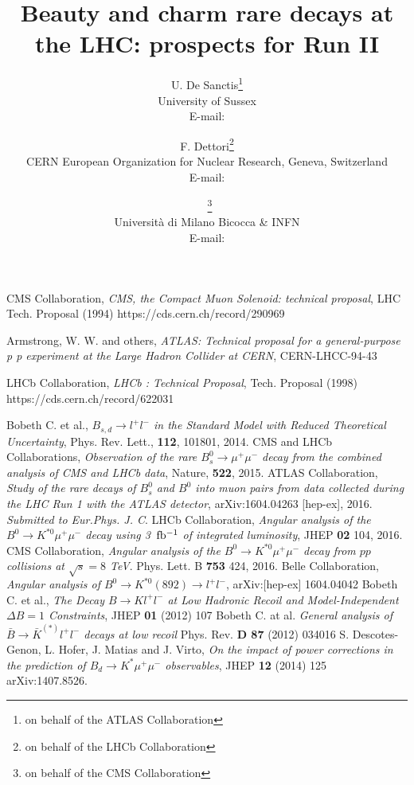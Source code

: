 \documentclass{PoS}
\title{Beauty and charm rare decays at the LHC: prospects for Run II}
\author{U. De Sanctis\thanks{on behalf of the ATLAS Collaboration}\\
        University of Sussex\\
        E-mail: \email{umberto.de.sanctis@cern.ch}\\}
\author{F. Dettori\thanks{on behalf of the LHCb Collaboration}\\
        CERN European Organization for Nuclear Research, Geneva, Switzerland\\
        E-mail: \email{francesco.dettori@cern.ch}\\ }
\author{\speaker{S. Fiorendi}~\thanks{on behalf of the CMS Collaboration}\\
       Universit\`a di Milano Bicocca \& INFN\\
        E-mail: \email{sara.fiorendi@cern.ch}
	}
\begin{document}




\clearpage



\begin{thebibliography}{99}
 CMS Collaboration, 
{\it{CMS, the Compact Muon Solenoid: technical proposal}},
LHC Tech. Proposal (1994) 
https://cds.cern.ch/record/290969

 Armstrong, W. W. and others, 
{\it{ATLAS: Technical proposal for a general-purpose p p experiment at the Large Hadron Collider at CERN}},
CERN-LHCC-94-43 

 LHCb Collaboration, 
{\it{LHCb : Technical Proposal}},
Tech. Proposal (1998) https://cds.cern.ch/record/622031

 Bobeth C. et al., {\it{$B_{s,d} \to l^+ l^-$ in the Standard Model with Reduced Theoretical Uncertainty}}, Phys. Rev. Lett., {\bf{112}}, 101801, 2014.
 CMS and LHCb Collaborations, {\it{Observation of the rare $B^0_s\rightarrow\mu^+\mu^-$ decay from the combined analysis of CMS and LHCb data}}, Nature, {\bf{522}}, 2015.
 ATLAS Collaboration, {\it{Study of the rare decays of $B^0_s$ and $B^0$  into muon pairs from data collected during the LHC Run 1 with the ATLAS detector}}, arXiv:1604.04263 [hep-ex], 2016. {\it{Submitted to Eur.Phys. J. C}}.
 LHCb Collaboration, {\it{Angular analysis of the $B^0 \to K^{*0}  \mu^+ \mu^-$ decay using 3~${\rm{fb^{-1}}}$ of integrated luminosity}}, JHEP {\bf{02}} 104, 2016. 
 CMS Collaboration, {\it{Angular analysis of the $B^0 \to K^{*0}  \mu^+ \mu^-$  decay from $pp$ collisions at $\sqrt{s} = 8$ TeV}}. Phys. Lett. B {\bf{753}} 424, 2016.
 Belle Collaboration, {\it{Angular analysis of $B^0 \to K^{*0}(892) \to l^+ l^-$}}, arXiv:[hep-ex] 1604.04042
 Bobeth C. et al., {\it{The Decay $B \to K l^+ l^-$ at Low Hadronic Recoil and Model-Independent $\Delta B = 1$ Constraints}}, JHEP {\bf{01}} (2012) 107 \newline
Bobeth C. at al. {\it{General analysis of $\bar{B} \to \bar{K}^{(*)} l^+ l^−$ decays at low recoil}} Phys. Rev. {\bf{D 87}} (2012) 034016
 S. Descotes-Genon, L. Hofer, J. Matias and J. Virto, {\it{On the impact of power corrections in the prediction of $B_d \to K^* \mu^+ \mu^-$ observables}}, JHEP {\bf{12}} (2014) 125 arXiv:1407.8526.



\end{thebibliography}
\end{document}
